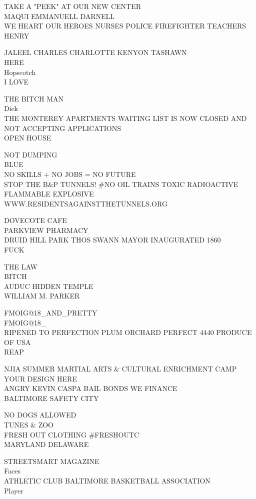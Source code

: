 \documentclass[10pt,letterpaper]{article}
\begin{document}
TAKE A "PEEK" AT OUR NEW CENTER\\
MAQUI EMMANUELL DARNELL\\
WE HEART OUR HEROES NURSES POLICE FIREFIGHTER TEACHERS\\
HENRY

JALEEL CHARLES CHARLOTTE KENYON TASHAWN\\
HERE\\
Hopscotch\\
I LOVE

THE BITCH MAN\\
Dick\\
THE MONTEREY APARTMENTS WAITING LIST IS NOW CLOSED AND NOT ACCEPTING APPLICATIONS\\
OPEN HOUSE

NOT DUMPING\\
BLUE\\
NO SKILLS + NO JOBS = NO FUTURE\\
STOP THE B\&P TUNNELS!  \#NO OIL TRAINS TOXIC RADIOACTIVE FLAMMABLE EXPLOSIVE WWW.RESIDENTSAGAINSTTHETUNNELS.ORG

DOVECOTE CAFE\\
PARKVIEW PHARMACY\\
DRUID HILL PARK THOS SWANN MAYOR INAUGURATED 1860\\
FUCK

THE LAW\\
BITCH\\
AUDUC HIDDEN TEMPLE\\
WILLIAM M. PARKER

FMOIG@18\_AND\_PRETTY\\
FMOIG@18\_\\
RIPENED TO PERFECTION PLUM ORCHARD PERFECT 4440 PRODUCE OF USA\\
REAP

NJIA SUMMER MARTIAL ARTS \& CULTURAL ENRICHMENT CAMP\\
YOUR DESIGN HERE\\
ANGRY KEVIN CASPA BAIL BONDS WE FINANCE\\
BALTIMORE SAFETY CITY

NO DOGS ALLOWED\\
TUNES \& ZOO\\
FRESH OUT CLOTHING \#FRESHOUTC\\
MARYLAND DELAWARE

STREETSMART MAGAZINE\\
Faces\\
ATHLETIC CLUB BALTIMORE BASKETBALL ASSOCIATION\\
Player
\end{document}
